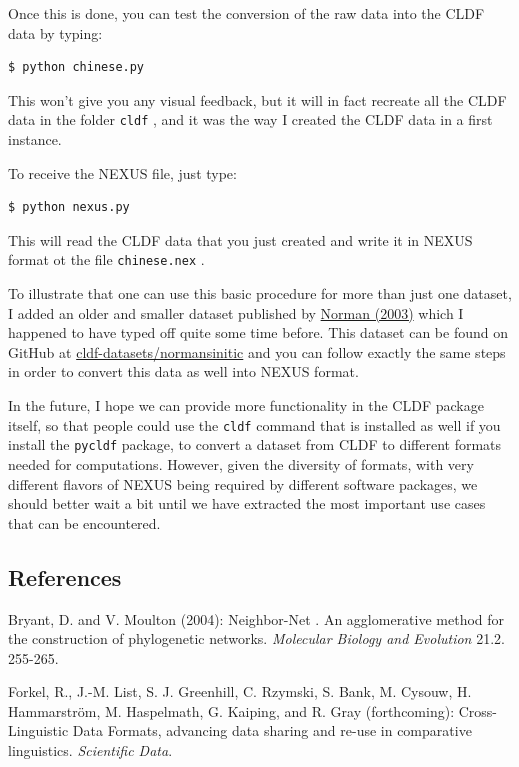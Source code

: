 \documentclass[
  a4paper,
  14pt,
  oneside,
  tablecaptionabove
]{scrbook}
\begin{document}
Once this is done, you can test the conversion of the raw data into the
CLDF data by typing:

\begin{lstlisting}
$ python chinese.py
\end{lstlisting}

This won't give you any visual feedback, but it will in fact recreate
all the CLDF data in the folder \lstinline!cldf! , and it was the way I
created the CLDF data in a first instance.

To receive the NEXUS file, just type:

\begin{lstlisting}
$ python nexus.py
\end{lstlisting}

This will read the CLDF data that you just created and write it in NEXUS
format ot the file \lstinline!chinese.nex! .

To illustrate that one can use this basic procedure for more than just
one dataset, I added an older and smaller dataset published by
\href{http://bibliography.lingpy.org?key=Normal2003}{Norman (2003)}
which I happened to have typed off quite some time before. This dataset
can be found on GitHub at
\href{https://github.com/cldf-datasets/normansinitic}{cldf-datasets/normansinitic}
and you can follow exactly the same steps in order to convert this data
as well into NEXUS format.

In the future, I hope we can provide more functionality in the CLDF
package itself, so that people could use the \lstinline!cldf! command
that is installed as well if you install the \lstinline!pycldf! package,
to convert a dataset from CLDF to different formats needed for
computations. However, given the diversity of formats, with very
different flavors of NEXUS being required by different software
packages, we should better wait a bit until we have extracted the most
important use cases that can be encountered.

\subsection*{References}

\nopagebreak\hangindent=0.7cm {\small Bryant, D. and V. Moulton (2004): {Neighbor-Net} {. An
agglomerative method for the construction of phylogenetic networks}. 
\emph{Molecular Biology and Evolution} 21.2. 255-265. }

\nopagebreak\hangindent=0.7cm {\small Forkel, R., J.-M. List, S. J. Greenhill, C. Rzymski, S. Bank, M. Cysouw,
H. Hammarström, M. Haspelmath, G. Kaiping, and R. Gray (forthcoming):
{Cross-Linguistic Data Formats, advancing data sharing and re-use
in comparative linguistics}.  \emph{Scientific Data}. }
\end{document}
